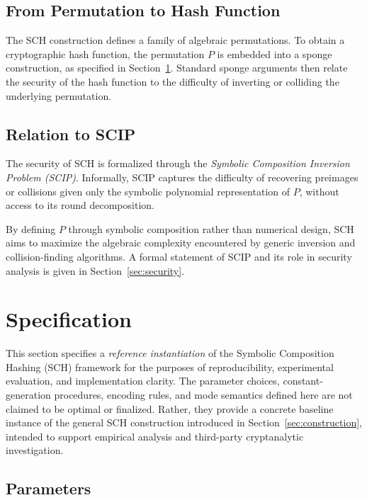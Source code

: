 ﻿\documentclass[english]{aucmcs}
\begin{document}
\subsection{From Permutation to Hash Function}

The SCH construction defines a family of algebraic permutations.
To obtain a cryptographic hash function, the permutation $P$ is embedded
into a sponge construction, as specified in Section~\ref{sec:spec}.
Standard sponge arguments then relate the security of the hash function
to the difficulty of inverting or colliding the underlying permutation.

\subsection{Relation to SCIP}

The security of SCH is formalized through the
\emph{Symbolic Composition Inversion Problem (SCIP)}.
Informally, SCIP captures the difficulty of recovering preimages or collisions
given only the symbolic polynomial representation of $P$, without access to its
round decomposition.

By defining $P$ through symbolic composition rather than numerical design,
SCH aims to maximize the algebraic complexity encountered by generic inversion
and collision-finding algorithms.
A formal statement of SCIP and its role in security analysis is given in
Section~\ref{sec:security}.



\section{Specification}
\label{sec:spec}

This section specifies a \emph{reference instantiation} of the Symbolic Composition
Hashing (SCH) framework for the purposes of reproducibility, experimental
evaluation, and implementation clarity. The parameter choices, constant-generation
procedures, encoding rules, and mode semantics defined here are not claimed to be
optimal or finalized. Rather, they provide a concrete baseline instance of the
general SCH construction introduced in Section~\ref{sec:construction}, intended
to support empirical analysis and third-party cryptanalytic investigation.

\subsection{Parameters}
\end{document}
